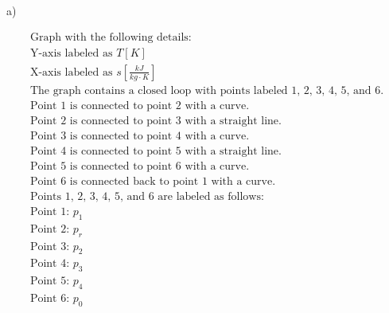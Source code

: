 a)

\[
\begin{array}{c}
\text{Graph with the following details:} \\
\text{Y-axis labeled as } T [K] \\
\text{X-axis labeled as } s \left[ \frac{kJ}{kg \cdot K} \right] \\
\text{The graph contains a closed loop with points labeled 1, 2, 3, 4, 5, and 6.} \\
\text{Point 1 is connected to point 2 with a curve.} \\
\text{Point 2 is connected to point 3 with a straight line.} \\
\text{Point 3 is connected to point 4 with a curve.} \\
\text{Point 4 is connected to point 5 with a straight line.} \\
\text{Point 5 is connected to point 6 with a curve.} \\
\text{Point 6 is connected back to point 1 with a curve.} \\
\text{Points 1, 2, 3, 4, 5, and 6 are labeled as follows:} \\
\text{Point 1: } p_1 \\
\text{Point 2: } p_r \\
\text{Point 3: } p_2 \\
\text{Point 4: } p_3 \\
\text{Point 5: } p_4 \\
\text{Point 6: } p_0 \\
\end{array}
\]